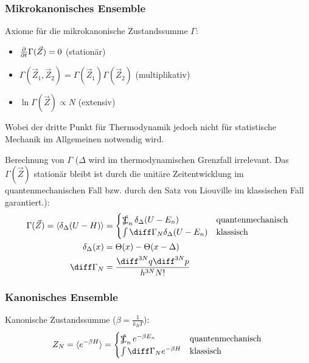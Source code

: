 \documentclass[11pt]{article}
\DeclareMathOperator*{\SumInt}{%
\mathchoice%
  {\ooalign{$\displaystyle\sum$\cr\hidewidth$\displaystyle\int$\hidewidth\cr}}
  {\ooalign{\raisebox{.14\height}{\scalebox{.7}{$\textstyle\sum$}}\cr\hidewidth$\textstyle\int$\hidewidth\cr}}
  {\ooalign{\raisebox{.2\height}{\scalebox{.6}{$\scriptstyle\sum$}}\cr$\scriptstyle\int$\cr}}
  {\ooalign{\raisebox{.2\height}{\scalebox{.6}{$\scriptstyle\sum$}}\cr$\scriptstyle\int$\cr}}
}
\numberwithin{equation}{section}
\begin{document}
      \subsubsection{Mikrokanonisches Ensemble}
        Axiome für die mikrokanonische Zustandssumme $\Gamma$:
        \begin{itemize}\itemsep -0pt  %
          \item $\frac{\partial }{\partial t}\Gamma(\vec{Z}) = 0$ \hfill{(stationär)}
          \item $\Gamma(\vec{Z}_1,\vec{Z}_2) = \Gamma(\vec{Z}_1)\Gamma(\vec{Z}_2) $ \hfill{(multiplikativ)}
          \item $\ln\Gamma(\vec{Z}) \propto N$ \hfill{(extensiv)}
        \end{itemize}
        Wobei der dritte Punkt für Thermodynamik jedoch nicht für statistische Mechanik im Allgemeinen notwendig wird.

        Berechnung von $\Gamma$ ($\Delta$ wird im thermodynamischen Grenzfall irrelevant. Das $\Gamma(\vec{Z})$ stationär bleibt ist durch die unitäre Zeitentwicklung im quantenmechanischen Fall bzw. durch den Satz von Liouville im klassischen Fall garantiert.):
        \begin{equation}
          \begin{aligned}
            \Gamma(\vec{Z}) = \langle \delta_\Delta (U-H) \rangle
              &= \begin{cases}
                  \SumInt_n \delta_\Delta(U-E_n) & \text{quantenmechanisch} \\
                  \int \diff \Gamma_N \delta_\Delta(U-E_n) & \text{klassisch}
                \end{cases} \\
            \delta_\Delta(x) &= \Theta(x) - \Theta(x-\Delta)\\
            \diff \Gamma_N &= \frac{\diff^{3N}q \diff^{3N}p }{h^{3N} N!}
          \end{aligned}
        \end{equation}

      \subsubsection{Kanonisches Ensemble}
        Kanonische Zustandssumme ($\beta = \frac{1}{k_B T}$):
        \begin{equation}
          Z_N=\langle e^{-\beta H} \rangle
            = \begin{cases}
                \SumInt_n e^{-\beta E_n} & \text{quantenmechanisch} \\
                \int \diff \Gamma_N e^{-\beta H} & \text{klassisch}
              \end{cases} \\
        \end{equation}
\end{document}
